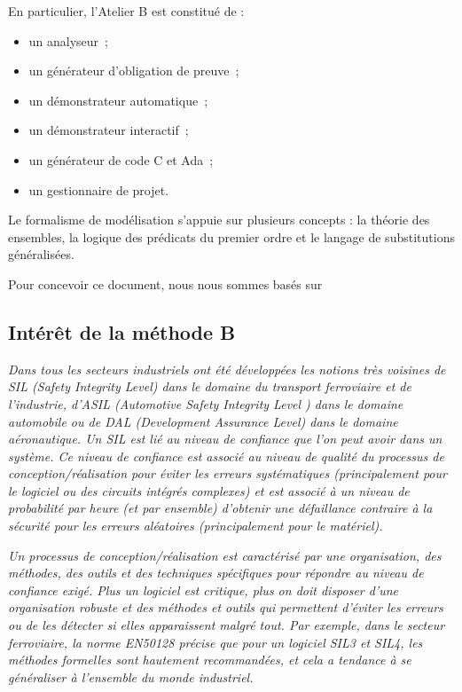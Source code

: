 \documentclass[10pt,a4paper]{article}
\begin{document}
En particulier, l'Atelier B est constitué de :
\begin{itemize}
\item un analyseur~;
\item un générateur d'obligation de preuve~;
\item un démonstrateur automatique~;
\item un démonstrateur interactif~;
\item un générateur de code C et Ada~;
\item un gestionnaire de projet.
\end{itemize}

Le formalisme de modélisation s'appuie sur plusieurs concepts : la théorie des ensembles, la logique des prédicats du premier ordre et le langage de substitutions généralisées.

Pour concevoir ce document, nous nous sommes basés sur \cite{behm1999meteor, habrias2006specifications, theBBook, dossierTechnique}

\subsection{Intérêt de la méthode B}
\emph{Dans tous les secteurs industriels ont été développées les notions très voisines de SIL (Safety Integrity Level) dans le domaine du transport ferroviaire et de l’industrie, d’ASIL (Automotive Safety Integrity Level ) dans le domaine automobile ou de DAL (Development Assurance Level) dans le domaine aéronautique. Un SIL est lié au niveau de confiance que l'on peut avoir dans un système. Ce niveau de confiance est associé au niveau de qualité du processus de conception/réalisation pour éviter les erreurs systématiques (principalement pour le logiciel ou des circuits intégrés complexes) et est associé à un niveau de probabilité par heure (et par ensemble) d'obtenir une défaillance contraire à la sécurité pour les erreurs aléatoires (principalement pour le matériel).}\cite{dossierTechnique}

\emph{Un processus de conception/réalisation est caractérisé par une organisation, des méthodes, des outils et des techniques spécifiques pour répondre au niveau de confiance exigé. Plus un logiciel est critique, plus on doit disposer d'une organisation robuste et des méthodes et outils qui permettent d'éviter les erreurs ou de les détecter si elles apparaissent malgré tout. Par exemple, dans le secteur ferroviaire, la norme EN50128 précise que pour un logiciel SIL3 et SIL4, les méthodes formelles sont hautement recommandées, et cela a tendance à se généraliser à l'ensemble du monde industriel.}\cite{dossierTechnique}
\end{document}

